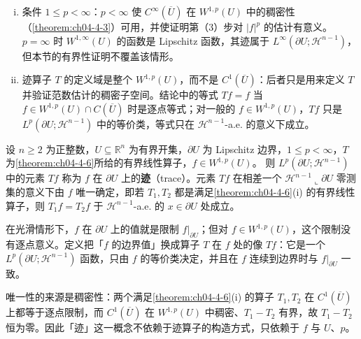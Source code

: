 \documentclass[../../main.tex]{subfiles}%
\begin{document}
\begin{remark}
\begin{enumerate}[(i)]
\begin{align*}
\end{align*}
于是迹不等式 $\int_{\partial U}\lvert Tf\rvert\diff\mathcal{H}^1\leqslant C\int_U(\lvert Df\rvert+\lvert f\rvert)\diff x$ 对 $f=f_\varepsilon$ 蕴涵 $\varepsilon/2\leqslant2C(\varepsilon e^{-1/\varepsilon}+e^{-2/\varepsilon})$，令 $\varepsilon\to0$ 得矛盾。
\item 条件 $1\leqslant p<\infty$：$p<\infty$ 使 $C^\infty(\overline{U})$ 在 $W^{1,p}(U)$ 中的稠密性（\cref{theorem:ch04-4-3}）可用，并使证明第（3）步对 $\lvert f\rvert^p$ 的估计有意义。$p=\infty$ 时 $W^{1,\infty}(U)$ 的函数是 Lipschitz 函数，其迹属于 $L^\infty(\partial U;\mathcal{H}^{n-1})$，但本节的有界性证明不覆盖该情形。%
\item 迹算子 $T$ 的定义域是整个 $W^{1,p}(U)$，而不是 $C^1(\overline{U})$：后者只是用来定义 $T$ 并验证范数估计的稠密子空间。结论中的等式 $Tf=f$ 当 $f\in W^{1,p}(U)\cap C(\overline{U})$ 时是逐点等式；对一般的 $f\in W^{1,p}(U)$，$Tf$ 只是 $L^p(\partial U;\mathcal{H}^{n-1})$ 中的等价类，等式只在 $\mathcal{H}^{n-1}$-a.e. 的意义下成立。
\end{enumerate}
\end{remark}

\begin{definition}[迹]\label{definition:ch04-4-5}
设 $n\geqslant2$ 为正整数，$U\subseteq\mathbb{R}^n$ 为有界开集，$\partial U$ 为 Lipschitz 边界，$1\leqslant p<\infty$，$T$ 为\cref{theorem:ch04-4-6}所给的有界线性算子，$f\in W^{1,p}(U)$。%
则 $L^p(\partial U;\mathcal{H}^{n-1})$ 中的元素 $Tf$ 称为 $f$ 在 $\partial U$ 上的\textbf{迹}（trace）。元素 $Tf$ 在相差一个 $\mathcal{H}^{n-1}\llcorner\partial U$ 零测集的意义下由 $f$ 唯一确定，即若 $T_1,T_2$ 都是满足\cref{theorem:ch04-4-6}(i) 的有界线性算子，则 $T_1f=T_2f$ 于 $\mathcal{H}^{n-1}$-a.e. 的 $x\in\partial U$ 处成立。%
\end{definition}

\begin{remark}\label{remark:ch04-def-4-5-动机}
在光滑情形下，$f$ 在 $\partial U$ 上的值就是限制 $f|_{\partial U}$；但对 $f\in W^{1,p}(U)$，这个限制没有逐点意义。定义把「$f$ 的边界值」换成算子 $T$ 在 $f$ 处的像 $Tf$：它是一个 $L^p(\partial U;\mathcal{H}^{n-1})$ 函数，只由 $f$ 的等价类决定，并且在 $f$ 连续到边界时与 $f|_{\partial U}$ 一致。

唯一性的来源是稠密性：两个满足\cref{theorem:ch04-4-6}(i) 的算子 $T_1,T_2$ 在 $C^1(\overline{U})$ 上都等于逐点限制，而 $C^1(\overline{U})$ 在 $W^{1,p}(U)$ 中稠密、$T_1-T_2$ 有界，故 $T_1-T_2$ 恒为零。因此「迹」这一概念不依赖于迹算子的构造方式，只依赖于 $f$ 与 $U$、$p$。%
\end{remark}
\end{document}

